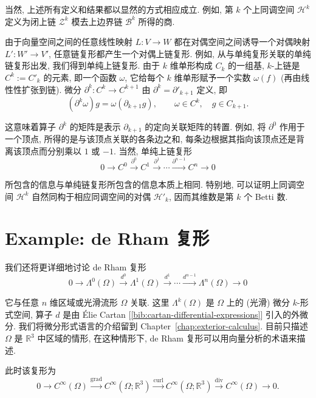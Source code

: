 当然, 上述所有定义和结果都以显然的方式相应成立. 例如, 第 $k$ 个上同调空间 $\mathcal H^k$ 定义为闭上链 $\mathcal Z^k$ 模去上边界链 $\mathcal B^k$ 所得的商.

由于向量空间之间的任意线性映射 $L:V\to W$ 都在对偶空间之间诱导一个对偶映射 $L':W'\to V'$, 任意链复形都产生一个对偶上链复形. 例如, 从与单纯复形关联的单纯链复形出发, 我们得到单纯上链复形. 由于 $k$ 维单形构成 $C_k$ 的一组基, $k$-上链是 $C^k:=C'_k$ 的元素, 即一个函数 $\omega$, 它给每个 $k$ 维单形赋予一个实数 $\omega(f)$ (再由线性性扩张到链). 微分 $\partial^k:C^k\to C^{k+1}$ 由 $\partial^k=\partial'_{k+1}$ 定义, 即
\[
(\partial^k\omega)g=\omega(\partial_{k+1}g),\qquad \omega\in C^k,\quad g\in C_{k+1}.
\]

这意味着算子 $\partial^k$ 的矩阵是表示 $\partial_{k+1}$ 的定向关联矩阵的转置. 例如, 将 $\partial^0$ 作用于一个顶点, 所得的是与该顶点关联的各条边之和, 每条边根据其指向该顶点还是背离该顶点而分别乘以 $1$ 或 $-1$. 当然, 单纯上链复形
\begin{equation}\label{eq:simplicial-cochain-complex}
0\to C^0\xrightarrow{\partial^0}C^1\xrightarrow{\partial^1}\cdots\xrightarrow{\partial^{n-1}}C^n\to0
\end{equation}

所包含的信息与单纯链复形所包含的信息本质上相同. 特别地, 可以证明上同调空间 $\mathcal H^k$ 自然同构于相应同调空间的对偶 $\mathcal H'_k$, 因而其维数是第 $k$ 个 Betti 数.

\section{Example: de Rham 复形}\label{sec:de-rham-complex}

我们还将更详细地讨论 de Rham 复形
\begin{equation}\label{eq:differential-forms-de-rham-complex}
0\to\Lambda^0(\Omega)\xrightarrow{d^0}\Lambda^1(\Omega)\xrightarrow{d^1}\cdots\xrightarrow{d^{n-1}}\Lambda^n(\Omega)\to0
\end{equation}

它与任意 $n$ 维区域或光滑流形 $\Omega$ 关联. 这里 $\Lambda^k(\Omega)$ 是 $\Omega$ 上的 (光滑) 微分 $k$-形式空间, 算子 $d$ 是由 Élie Cartan [\ref{bib:cartan-differential-expressions}] 引入的外微分. 我们将微分形式语言的介绍留到 Chapter~\ref{chap:exterior-calculus}. 目前只描述 $\Omega$ 是 $\mathbb R^3$ 中区域的情形, 在这种情形下, de Rham 复形可以用向量分析的术语来描述.

此时该复形为
\begin{equation}\label{eq:vector-calculus-de-rham-complex}
0\to C^\infty(\Omega)\xrightarrow{\operatorname{grad}}C^\infty(\Omega;\mathbb R^3)\xrightarrow{\operatorname{curl}}C^\infty(\Omega;\mathbb R^3)\xrightarrow{\operatorname{div}}C^\infty(\Omega)\to0.
\end{equation}

